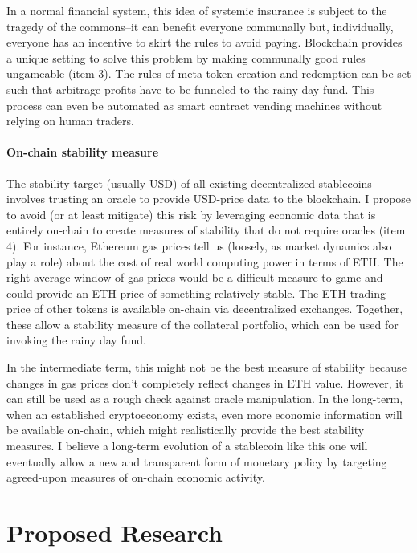 \documentclass[10pt]{article}
\begin{document}
In a normal financial system, this idea of systemic insurance is subject to the tragedy of the commons--it can benefit everyone communally but, individually, everyone has an incentive to skirt the rules to avoid paying. Blockchain provides a unique setting to solve this problem by making communally good rules ungameable (item 3). The rules of meta-token creation and redemption can be set such that arbitrage profits have to be funneled to the rainy day fund. This process can even be automated as smart contract vending machines without relying on human traders.

\paragraph{On-chain stability measure}
The stability target (usually USD) of all existing decentralized stablecoins involves trusting an oracle to provide USD-price data to the blockchain. I propose to avoid (or at least mitigate) this risk by leveraging economic data that is entirely on-chain to create measures of stability that do not require oracles (item 4). For instance, Ethereum gas prices tell us (loosely, as market dynamics also play a role) about the cost of real world computing power in terms of ETH. The right average window of gas prices would be a difficult measure to game and could provide an ETH price of something relatively stable. The ETH trading price of other tokens is available on-chain via decentralized exchanges. Together, these allow a stability measure of the collateral portfolio, which can be used for invoking the rainy day fund.

In the intermediate term, this might not be the best measure of stability because changes in gas prices don't completely reflect changes in ETH value. However, it can still be used as a rough check against oracle manipulation. In the long-term, when an established cryptoeconomy exists, even more economic information will be available on-chain, which might realistically provide the best stability measures. I believe a long-term evolution of a stablecoin like this one will eventually allow a new and transparent form of monetary policy by targeting agreed-upon measures of on-chain economic activity.





\section{Proposed Research}\label{sec:proposed_research}
\end{document}
